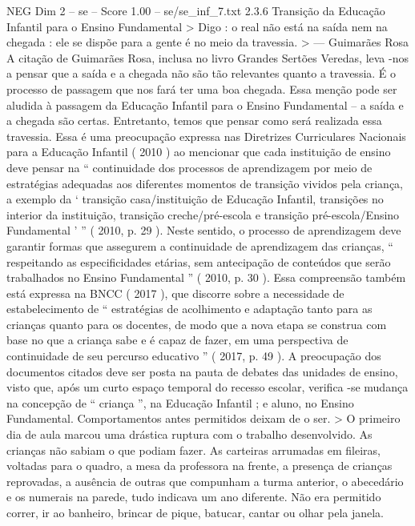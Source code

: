 \begin{textsample}{NEG Dim 2 – se – Score 1.00 – se/se\_inf\_7.txt}  \label{ex:f2_neg_266}
2.3.6 Transição da Educação Infantil para o Ensino Fundamental > Digo : o real não está na saída nem na chegada : ele se dispõe para a gente é no meio da travessia. > — Guimarães Rosa A citação de Guimarães Rosa, inclusa no livro Grandes Sertões Veredas, leva -nos a pensar que a saída e a chegada não são tão relevantes quanto a travessia.
É o processo de passagem que nos fará ter uma boa chegada.
Essa menção pode ser aludida à passagem da Educação Infantil para o Ensino Fundamental – a saída e a chegada são certas.
Entretanto, temos que pensar como será realizada essa travessia.
Essa é uma preocupação expressa nas Diretrizes Curriculares Nacionais para a Educação Infantil ( 2010 ) ao mencionar que cada instituição de ensino deve pensar na “ continuidade dos processos de aprendizagem por meio de estratégias adequadas aos diferentes momentos de transição vividos pela criança, a exemplo da ‘ transição casa/instituição de Educação Infantil, transições no interior da instituição, transição creche/pré-escola e transição pré-escola/Ensino Fundamental ’ ” ( 2010, p. 29 ).
Neste sentido, o processo de aprendizagem deve garantir formas que assegurem a continuidade de aprendizagem das crianças, “ respeitando as especificidades etárias, sem antecipação de conteúdos que serão trabalhados no Ensino Fundamental ” ( 2010, p. 30 ).
Essa compreensão também está expressa na BNCC ( 2017 ), que discorre sobre a necessidade de estabelecimento de “ estratégias de acolhimento e adaptação tanto para as crianças quanto para os docentes, de modo que a nova etapa se construa com base no que a criança sabe e é capaz de fazer, em uma perspectiva de continuidade de seu percurso educativo ” ( 2017, p. 49 ).
A preocupação dos documentos citados deve ser posta na pauta de debates das unidades de ensino, visto que, após um curto espaço temporal do recesso escolar, verifica -se mudança na concepção de “ criança ”, na Educação Infantil ; e aluno, no Ensino Fundamental.
Comportamentos antes permitidos deixam de o ser. > O primeiro dia de aula marcou uma drástica ruptura com o trabalho desenvolvido.
As crianças não sabiam o que podiam fazer.
As carteiras arrumadas em fileiras, voltadas para o quadro, a mesa da professora na frente, a presença de crianças reprovadas, a ausência de outras que compunham a turma anterior, o abecedário e os numerais na parede, tudo indicava um ano diferente.
Não era permitido correr, ir ao banheiro, brincar de pique, batucar, cantar ou olhar pela janela.

\end{textsample}
